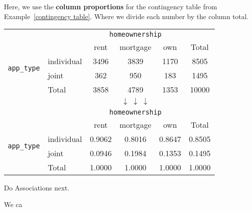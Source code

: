 \documentclass{beamer}
\begin{document}
\begin{frame}
\begin{example}
Here, we use the \textbf{column proportions} for the contingency table from Example~\ref{contingency table}. Where we divide each number by the column total.
\begin{center}
\begin{tabular}{llcccc}
&&\multicolumn{3}{c}{\texttt{homeownership}} &\\\cline{3-5}
&&rent&mortgage&own&Total\\\cline{2-6}
\multirow{2}{*}{{\texttt{app\_type}}} & individual & 3496 & 3839 & 1170 & 8505 \\
&joint & 362 & 950 & 183 & 1495 \\\cline{2-6}
&Total & 3858 & 4789 & 1353 & 10000 \\\cline{2-6}
&&&$\downarrow~\downarrow~\downarrow$\\
&&\multicolumn{3}{c}{\texttt{homeownership}} &\\\cline{3-5}
&&rent&mortgage&own&Total\\\cline{2-6}
\multirow{2}{*}{{\texttt{app\_type}}} & individual & 0.9062 & 0.8016 & 0.8647 & 0.8505 \\
&joint & 0.0946 & 0.1984 & 0.1353 & 0.1495 \\\cline{2-6}
&Total & 1.0000 & 1.0000 & 1.0000 & 1.0000 \\\cline{2-6}
\end{tabular}
\end{center}\pause
{}\pause
{}
\end{example}
\end{frame}

\begin{frame}
Do Associations next.
\begin{note}
We ca
\end{note}
\end{frame}
\end{document}
